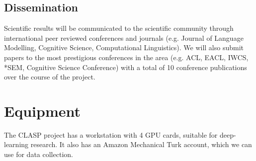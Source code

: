 \documentclass[11pt,a4paper]{article}
\newcommand{\instruction}[1]{}
\begin{document}
\subsection{Dissemination}

Scientific results will be communicated to the scientific community through international peer reviewed conferences and journals (e.g. Journal of Language Modelling, Cognitive Science, Computational Linguistics). We will also submit papers to the most prestigious conferences in the area (e.g. ACL, EACL, IWCS, *SEM, Cognitive Science Conference) with a total of 10 conference publications over the course of the project.






\section{Equipment}

The CLASP project has a workstation with 4 GPU cards, suitable for deep-learning research. It also has an Amazon Mechanical Turk account, which we can use for data collection.


\end{document}
